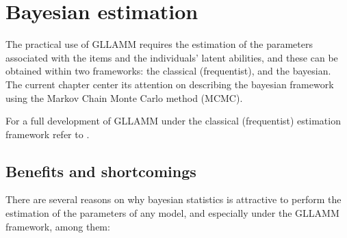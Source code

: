 \chapter{Bayesian estimation} \label{chap:estimation}

The practical use of GLLAMM requires the estimation of the parameters associated with the items and the individuals' latent abilities, and these can be obtained within two frameworks: the classical (frequentist), and the bayesian. The current chapter center its attention on describing the bayesian framework using the Markov Chain Monte Carlo method (MCMC).

For a full development of GLLAMM under the classical (frequentist) estimation framework refer to \citet{Rabe_et_al_2004a, Rabe_et_al_2004b, Skrondal_et_al_2004a, Rabe_et_al_2012}.


\section{Benefits and shortcomings}

There are several reasons on why bayesian statistics is attractive to perform the estimation of the parameters of any model, and especially under the GLLAMM framework, among them:

